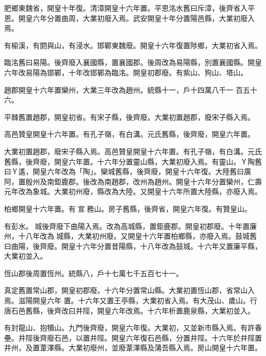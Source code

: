 \begin{pinyinscope}
 肥鄉東魏省，開皇十年復。清漳開皇十六年置。平恩洺水舊曰斥漳，後齊省入平恩。開皇六年分置曲周，大業初廢入焉。武安開皇十年分置陽邑縣，大業初廢入焉。



 有榆溪，有閼與山，有浸水。邯鄲東魏廢。開皇十六年復置陟鄉，大業初省入焉。



 臨洺舊曰易陽。後齊廢入襄國縣，置襄國郡。後周改為易陽縣，別置襄國縣。開皇六年改易陽為邯鄲，十年改邯鄲為臨洺。開皇初郡廢。有紫山、狗山、塔山。



 趙郡開皇十六年置欒州，大業三年改為趙州。統縣十一，戶十四萬八千一
 百五十六。



 平棘舊置趙郡，開皇初省。有宋子縣，後齊廢。大業初置趙郡，廢宋子縣入焉。



 高邑贊皇開皇十六年置。有孔子嶺，有白溝。元氏舊縣，後齊廢，開皇六年置。



 大業初置趙郡，廢宋子縣入焉。高邑贊皇開皇十六年置。有孔子嶺，有白溝。元氏舊縣，後齊廢，開皇六年置。十六年分置靈山縣，大業初廢入焉。有靈山。Ｙ陶舊曰Ｙ遙，開皇六年改為「陶」。欒城舊縣，後齊廢，開皇十六年復。大陸舊曰廣阿，置殷州及南鉅鹿郡。後改為南趙郡，改州為趙州。開皇十六年分置欒州，仁壽元年改為象城。大業初州廢，縣改為大陸。又開皇十六年所置大陸縣，亦廢入焉。



 柏鄉開皇十六年置。有宣務山。房子舊縣，後齊省，開皇六年復。有贊皇山。



 有彭水。城後齊廢下曲陽入焉。改為高城縣，置鉅鹿郡。開皇初郡廢。十年置廉州，十八年改為城縣，大業初州廢。又開皇十六年置柏鄉縣，亦廢入焉。鼓城舊曰曲陽，後齊廢。開皇十六年分置昔陽縣，十八年改為鼓城。十六年又置廉平縣，大業初並入。



 恆山郡後周置恆州。統縣八，戶十七萬七千五百七十一。



 真定舊置常山郡，開皇初郡廢。十六年分置常山縣。大業初置恆山郡，省常山入焉。滋陽開皇六年
 置。十六年又置王亭縣，大業初省入焉。有大茂山、歲山。行唐石邑舊縣，後齊改曰井陘，開皇六年改焉。十六年析置鹿泉縣，大業初並入。



 有封龍山、抱犢山。九門後齊廢，開皇六年復。大業初，又並新市縣入焉。有許春壘。井陘後齊廢石邑，以置井陘。開皇六年復石邑縣，分置井陘。十六年於井陘置井州，及置葦澤縣。大業初廢州，並廢葦澤縣及蒲吾縣入焉。房山開皇十六年置。




\end{pinyinscope}
